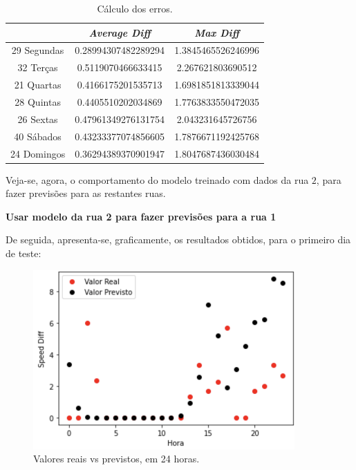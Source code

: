 \documentclass[a4paper, 12pt]{article}
\begin{document}
\begin{table}[H]
	\centering
	\begin{tabular}{||c||c|c||}
		\hline\hline
		& \textit{Average Diff} & \textit{Max Diff} \\
		\hline\hline
		29 Segundas & 0.28994307482289294
 & 1.3845465526246996 \\
		\hline
		32 Terças  &

0.5119070466633415 & 2.267621803690512 \\
		\hline
		21 Quartas & 0.4166175201535713
 & 1.6981851813339044	\\
		\hline
		28 Quintas  & 0.4405510202034869
 & 1.7763833550472035	\\
		\hline
		26 Sextas & 0.47961349276131754
 & 2.043231645726756  \\
		\hline
		40 Sábados  & 0.43233377074856605
 & 1.7876671192425768 \\
		\hline
		24 Domingos & 
0.36294389370901947 & 
1.8047687436030484
\\
		\hline\hline
	\end{tabular}
	\label{table:rua2}
	\caption{Cálculo dos erros.}
\end{table}

Veja-se, agora, o comportamento do modelo treinado com dados da rua $2$, para fazer previsões para as restantes ruas.

\vspace{0.5cm}
\textbf{Usar modelo da rua 2 para fazer previsões para a rua 1}

De seguida, apresenta-se, graficamente, os resultados obtidos, para o primeiro dia de teste:

\begin{figure}[H]
	\centering
	\includegraphics[width=10cm]{resultados/real_prev_mod2_rua1.png}
	\caption{Valores reais vs previstos, em 24 horas.}
\end{figure}
\end{document}
